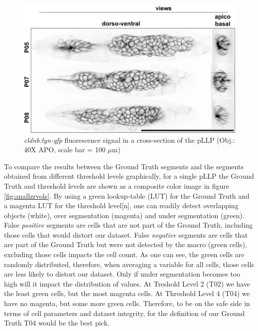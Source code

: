 \documentclass[10pt, b5paper, singlespacinge, twoside]{reedthesis} %
\theoremstyle{definition}
\theoremstyle{definition}
\theoremstyle{definition}
\theoremstyle{remark}
\begin{document}
\begin{figure}

{\centering \includegraphics[width=0.7\linewidth]{figures/materials/ground_truth/stackmem} 

}

\caption[Image data pLLP segmentation]{\emph{cldnb:lyn-gfp} fluorescence signal in a cross-section of the pLLP (Obj.: 40X APO, scale bar = 100 \(\mu\)m)}\label{fig:stackmem}
\end{figure}
To compare the results between the Ground Truth segments and the segments obtained from different threshold levels graphically, for a single pLLP the Ground Truth and threshold levels are shown as a composite color image in figure \ref{fig:anallzrvols}. By using a green lookup-table (LUT) for the Ground Truth and a magenta LUT for the threshold level{[}n{]}, one can readily detect overlapping objects (white), over segmentation (magenta) and under segmentation (green). False \emph{positive} segments are cells that are not part of the Ground Truth, including those cells that would distort our dataset. False \emph{negative} segments are cells that are part of the Ground Truth but were not detected by the macro (green cells), excluding those cells impacts the cell count. As one can see, the green cells are randomly distributed, therefore, when averaging a variable for all cells, those cells are less likely to distort our dataset. Only if under segmentation becomes too high will it impact the distribution of values. At Treshold Level 2 (T02) we have the least green cells, but the most magenta cells. At Threshold Level 4 (T04) we have no magenta, but some more green cells. Therefore, to be on the safe side in terms of cell parameters and dataset integrity, for the definition of our Ground Truth T04 would be the best pick.
\end{document}
